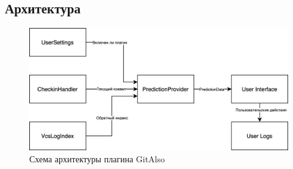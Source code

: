 \subsection{Архитектура}
\begin{figure}[!h]
\caption{Схема архитектуры плагина GitAlso}\label{GitAlso-arch}
\centering
\includegraphics[scale=0.16]{images/GitAlsoArch.png}
\end{figure}
